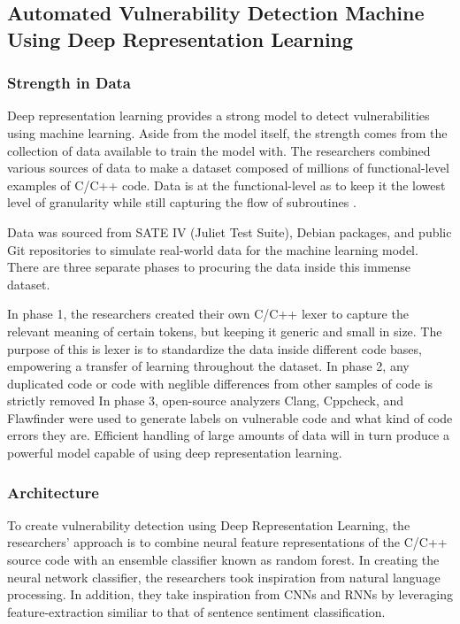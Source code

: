 \documentclass[12pt,twocolumn,letterpaper]{article}
\begin{document}
\subsection{Automated Vulnerability Detection Machine Using Deep Representation Learning}
\label{sub:automated-vulnerability-detection-machine-using-deep-representation-learning}

\subsubsection{Strength in Data}
Deep representation learning provides a strong model to detect vulnerabilities using machine learning. Aside from the model
itself, the strength comes from the collection of data available to train the model with. The researchers combined various
sources of data to make a dataset composed of millions of functional-level examples of C/C++ code. Data is at the
functional-level as to keep it the lowest level of granularity while still capturing the flow of subroutines \cite{Russell18}.

Data was sourced from SATE IV (Juliet Test Suite), Debian packages, and public Git repositories to simulate real-world data
for the machine learning model. There are three separate phases to procuring the data inside this immense dataset.

In phase 1, the researchers created their own C/C++ lexer to capture the relevant meaning of certain tokens, but keeping it
generic and small in size. The purpose of this is lexer is to standardize the data inside different code bases, empowering a transfer of learning throughout the dataset.
In phase 2, any duplicated code or code with neglible differences from other samples of code is strictly removed
In phase 3, open-source analyzers Clang, Cppcheck, and Flawfinder were used to generate labels on vulnerable code and what kind of code
errors they are.
Efficient handling of large amounts of data will in turn produce a powerful model capable of using deep representation learning.

\subsubsection{Architecture}
To create vulnerability detection using Deep Representation Learning, the researchers' approach is to combine
neural feature representations of the C/C++ source code with an ensemble classifier known as random forest. In creating
the neural network classifier, the researchers took inspiration from natural language processing. In addition, they take
inspiration from CNNs and RNNs by leveraging feature-extraction similiar to that of sentence sentiment classification.
\end{document}
